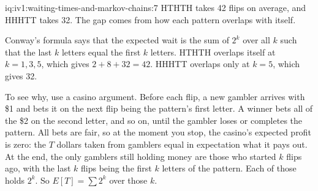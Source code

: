 \begin{solution}{iq:iv1:waiting-times-and-markov-chains:7}
HTHTH takes 42 flips on average, and HHHTT takes 32. The gap comes from how each pattern overlaps with itself.

Conway's formula says that the expected wait is the sum of $2^k$ over all $k$ such that the last $k$ letters equal the first $k$ letters. HTHTH overlaps itself at $k = 1, 3, 5$, which gives $2 + 8 + 32 = 42$. HHHTT overlaps only at $k = 5$, which gives 32.

To see why, use a casino argument. Before each flip, a new gambler arrives with \$1 and bets it on the next flip being the pattern's first letter. A winner bets all of the \$2 on the second letter, and so on, until the gambler loses or completes the pattern. All bets are fair, so at the moment you stop, the casino's expected profit is zero: the $T$ dollars taken from gamblers equal in expectation what it pays out. At the end, the only gamblers still holding money are those who started $k$ flips ago, with the last $k$ flips being the first $k$ letters of the pattern. Each of those holds $2^k$. So $E[T] = \sum 2^k$ over those $k$.

\end{solution}


